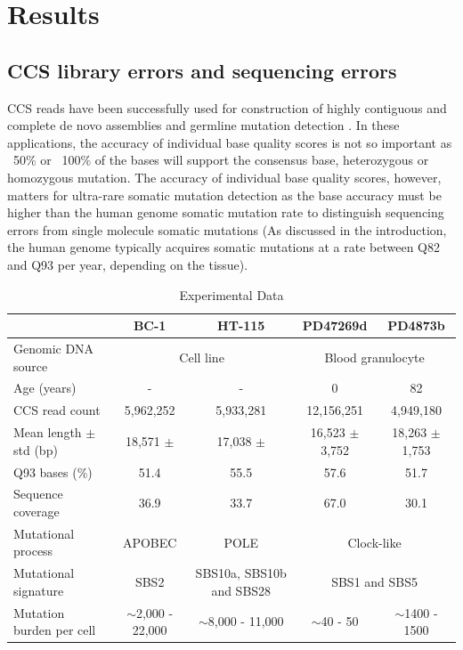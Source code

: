 \pagebreak

\section{Results}

\subsection{CCS library errors and sequencing errors}

CCS reads have been successfully used for construction of highly contiguous and complete de novo assemblies \cite{Wenger2019-pw} and germline mutation detection \cite{Poplin2018-ub}. In these applications, the accuracy of individual base quality scores is not so important as ~50\% or ~100\% of the bases will support the consensus base, heterozygous or homozygous mutation. The accuracy of individual base quality scores, however, matters for ultra-rare somatic mutation detection as the base accuracy must be higher than the human genome somatic mutation rate to distinguish sequencing errors from single molecule somatic mutations (As discussed in the introduction, the human genome typically acquires somatic mutations at a rate between Q82 and Q93 per year, depending on the tissue). 

\begin{table}[h!]
\caption{Experimental Data}
\label{tab:CCS-sequence-statistics}
\begin{adjustbox}{max width=1.1\textwidth,center}
\begin{tabular}{l|cccc}
                                     & BC-1 & HT-115 & PD47269d & PD4873b \\ \hline
Genomic DNA source                   & \multicolumn{2}{c}{Cell line} & \multicolumn{2}{c}{Blood granulocyte} \\  \hline
Age (years)                 		 & - & - & 0 & 82  \\ \hline
CCS read count                       &  5,962,252 &  5,933,281 & 12,156,251 & 4,949,180 \\ \hline
Mean length $\pm$ std (bp)  & 18,571 $\pm$     & 17,038 $\pm$   &  16,523 $\pm$ 3,752 & 18,263 $\pm$ 1,753 \\ \hline
Q93 bases (\%) 						 & 51.4 & 55.5 & 57.6 & 51.7 \\ \hline
Sequence coverage 				     & 36.9 & 33.7 & 67.0 & 30.1 \\ \hline
Mutational process   			     & APOBEC & POLE & \multicolumn{2}{c}{Clock-like} \\ \hline
Mutational signature 				 & SBS2   & SBS10a, SBS10b and SBS28 & \multicolumn{2}{c}{SBS1 and SBS5} \\ \hline
Mutation burden per cell 		     & $\sim$2,000 - 22,000 & $\sim$8,000 - 11,000 & $\sim$40 - 50 & $\sim$1400 - 1500 \\ \hline 
\end{tabular}
\end{adjustbox} 
\end{table}

